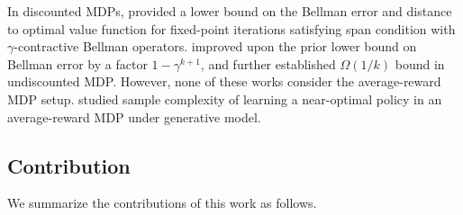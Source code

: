 \documentclass{article} %
\begin{document}
In discounted MDPs, \citet{goyal2022first} provided a lower bound on the Bellman error and distance to optimal value function for fixed-point iterations satisfying span condition with $\gamma$-contractive Bellman operators. \citet{lee2024accelerating} improved upon the prior lower bound on Bellman error by a factor $1-\gamma^{k+1}$, and further established $\Omega(1/k)$ bound in undiscounted MDP. However, none of these works consider the average-reward MDP setup. \citet{zurek2023span} studied sample complexity of learning a near-optimal policy in an average-reward MDP under generative model.

\subsection{Contribution}


We summarize the contributions of this work as follows.
\end{document}
